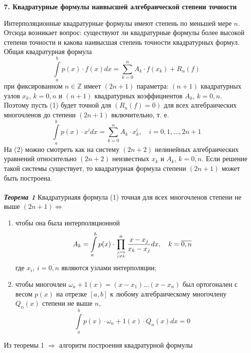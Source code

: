 \documentclass[14pt,a4paper,titlepage]{extarticle}
\begin{document}
\textbf{7. Квадратурные формулы наивысшей алгебраической степени точности}


Интерполяционные квадратурные формулы имеют степень по меньшей мере $n$. Отсюда возникает вопрос: существуют ли квадратурные формулы более высокой степени точности и какова наивысшая степень точности квадратурных формул. \\
Общая квадратурная формула
\begin{equation}
\int\limits_a^b p(x)\cdot f(x)dx = \sum_{k = 0}^n A_k \cdot f(x_k) + R_n(f)
\label{(1)}
\end{equation}
при фиксированном $n \in \mathbb{Z} $ имеет $(2n + 1)$ параметра: $(n+1)$ квадратурных узлов $x_k$, $k = \overline{0,n}$ и $(n+1)$ квадратурных коэффициентов $A_k$, $k = \overline{0,n}$. Поэтому пусть (1) будет точной для $( R_n ( f ) = 0 )$ для всех алгебраических многочленов до степени $(2n + 1)$ включительно, т. е.
\begin{equation}
\int\limits_a^b p(x)\cdot x^idx = \sum_{k = 0}^n A_k \cdot x_k^i,\quad i = 0, 1, \ldots, 2n+1
\label{(2)}
\end{equation}
На (2) можно смотреть как на систему $(2n+2)$ нелинейных алгебраических уравнений относительно $(2n+2)$ неизвестных $x_k$ и $A_k$, $k = \overline{0,n}$. Если решение такой системы существует, то квадратурная формула степени $(2n+1)$ может быть построена.
\\
\\
\textit{{\textbf{Теорема 1}}}
Квадратурнаяя формула (1) точная для всех многочленов степени не выше $(2n+1) \Leftrightarrow$ 
\begin{enumerate}
   \item чтобы она была интерполяционной
   \begin{equation}
		A_k = \int\limits_a^b p(x)\cdot \prod_{\genfrac{}{}{0pt}{}{j=0}{j\neq k}}^n \frac{x - x_j}{x_k - x_j} dx, \quad k = \overline{0,n}
		\label{(3)}
	\end{equation}
	где $x_i, \ i = \overline{0,n}$ являются узлами интерполяции;
	\item чтобы многочлен $\omega_n+1 (x) = (x-x_1)\ldots(x - x_n)$ был ортогонален с весом $p(x)$
	на отрезке $\left[  a, b\right] $ к любому алгебраическому многочлену $Q_n(x)$ степени не выше $n$, 
	\begin{equation}
		\int\limits_a^b p(x)\cdot \omega_n+1 (x) \cdot Q_n(x) dx = 0
		\label{(4)}
	\end{equation}
   \end{enumerate}
   Из теоремы 1 $\Rightarrow$ алгоритм	построения квадратурной формулы
\end{document}
